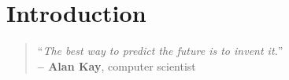 
%

%



\chapter{Introduction}%
\label{cha:introduction}


%
\begin{quote}
\begin{flushright}
``\emph{The best way to predict the future is to invent it.}'' \\
\textbf{-- Alan Kay}, computer scientist
\end{flushright}
\end{quote}
  
